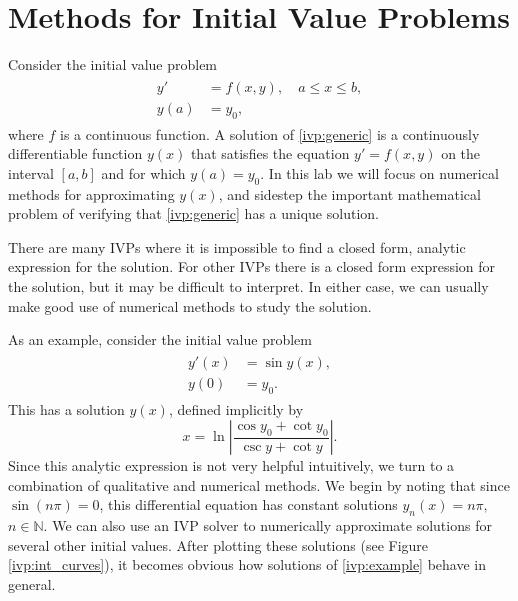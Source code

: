 \label{lab:ivp}


\section*{Methods for Initial Value Problems}
Consider the initial value problem
\begin{align}
	\begin{split}
y' &= f(x,y),\quad a \leq x \leq b, \\
y(a) &= y_0, 
	\end{split}\label{ivp:generic}
\end{align}
where $f$ is a continuous function. 
A solution of \eqref{ivp:generic} is a continuously differentiable function $y(x)$ that satisfies the equation $y' = f(x,y)$ on the interval $[a,b]$ and for which $y(a) = y_0$. 
In this lab we will focus on numerical methods for approximating $y(x)$, and sidestep the important mathematical problem of verifying that \eqref{ivp:generic} has a unique solution.

There are many IVPs where it is impossible to find a closed form, analytic expression for the solution.
For other IVPs there is a closed form expression for the solution, but it may be difficult to interpret.
In either case, we can usually make good use of numerical methods to study the solution. 

As an example, consider the initial value problem
\begin{align}
	\begin{split}
y'(x) &= \sin y(x), \\
y(0) &= y_0.
	\end{split}\label{ivp:example}
\end{align}
This has a solution $y(x)$, defined implicitly by
\[x = \ln \left|\frac{\cos y_0 + \cot y_0}{\csc y + \cot y} \right|.\]
Since this analytic expression is not very helpful intuitively, we turn to a combination of qualitative and numerical methods. 
We begin by noting that since $\sin (n \pi) = 0$, this differential equation has constant solutions $y_n(x) = n \pi,$ $n \in \mathbb{N}$. 
We can also use an IVP solver to numerically approximate solutions for several other initial values. 
After plotting these solutions (see Figure \ref{ivp:int_curves}), it becomes obvious how solutions of \eqref{ivp:example} behave in general.

